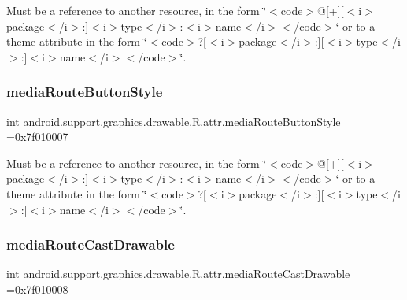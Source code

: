 Must be a reference to another resource, in the form \char`\"{}$<$code$>$@\mbox{[}+\mbox{]}\mbox{[}$<$i$>$package$<$/i$>$\+:\mbox{]}$<$i$>$type$<$/i$>$\+:$<$i$>$name$<$/i$>$$<$/code$>$\char`\"{} or to a theme attribute in the form \char`\"{}$<$code$>$?\mbox{[}$<$i$>$package$<$/i$>$\+:\mbox{]}\mbox{[}$<$i$>$type$<$/i$>$\+:\mbox{]}$<$i$>$name$<$/i$>$$<$/code$>$\char`\"{}. \mbox{\label{classandroid_1_1support_1_1graphics_1_1drawable_1_1R_1_1attr_a45fea7bb48629bab29689d1261c4cc11}} 
\subsubsection{\texorpdfstring{media\+Route\+Button\+Style}{mediaRouteButtonStyle}}
{\footnotesize\ttfamily int android.\+support.\+graphics.\+drawable.\+R.\+attr.\+media\+Route\+Button\+Style =0x7f010007\hspace{0.3cm}{\ttfamily [static]}}

Must be a reference to another resource, in the form \char`\"{}$<$code$>$@\mbox{[}+\mbox{]}\mbox{[}$<$i$>$package$<$/i$>$\+:\mbox{]}$<$i$>$type$<$/i$>$\+:$<$i$>$name$<$/i$>$$<$/code$>$\char`\"{} or to a theme attribute in the form \char`\"{}$<$code$>$?\mbox{[}$<$i$>$package$<$/i$>$\+:\mbox{]}\mbox{[}$<$i$>$type$<$/i$>$\+:\mbox{]}$<$i$>$name$<$/i$>$$<$/code$>$\char`\"{}. \mbox{\label{classandroid_1_1support_1_1graphics_1_1drawable_1_1R_1_1attr_abed6604d2c802ebfc497d1ca6f9af435}} 
\subsubsection{\texorpdfstring{media\+Route\+Cast\+Drawable}{mediaRouteCastDrawable}}
{\footnotesize\ttfamily int android.\+support.\+graphics.\+drawable.\+R.\+attr.\+media\+Route\+Cast\+Drawable =0x7f010008\hspace{0.3cm}{\ttfamily [static]}}

